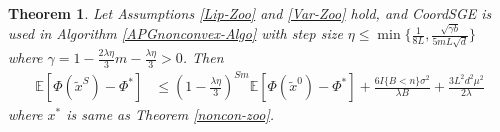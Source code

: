 \documentclass{article}
\newcommand*{\E}{\mathbb{E}}
\newtheorem{theorem}{Theorem}[section]
\theoremstyle{definition}
\theoremstyle{remark}
\begin{document}
\begin{theorem}\label{PL-Zoo}
Let Assumptions \ref{Lip-Zoo} and \ref{Var-Zoo} hold, and  CoordSGE  is  used  in
 Algorithm \ref{APGnonconvex-Algo} with step size $\eta \leq \min\{\frac{1}{8L}, \frac{\sqrt{\gamma b}}{5 m L \sqrt{d}}\}$ where $\gamma = 1-\frac{2\lambda\eta}{3} m-\frac{\lambda\eta}{3} > 0$. Then 
\begin{equation}\label{PL-eq-error}
\begin{split}
\E[\Phi(\widetilde{x}^S) - {\Phi}^*] & \leq   \left(1-\frac{\lambda\eta}{3}\right)^{Sm} \E[\Phi(\widetilde{x}^0) - {\Phi}^*] + \frac{6I\{B < n\} \sigma ^2}{\lambda B}+\frac{3 L^2 d^2 \mu^2}{2\lambda}
\end{split}
\end{equation}
where $x^*$ is same as Theorem \ref{noncon-zoo}.
\end{theorem}
\end{document}
